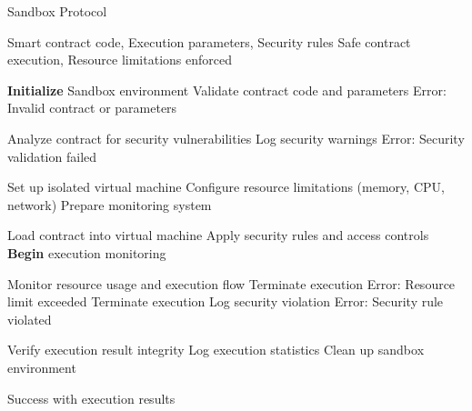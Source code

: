 
\begin{algorithm}
\caption{Sandbox Protocol}
\label{alg:sandbox}
\begin{algorithmic}[1]
\Require Smart contract code, Execution parameters, Security rules
\Ensure Safe contract execution, Resource limitations enforced

\State \textbf{Initialize} Sandbox environment
\State Validate contract code and parameters
    \State \Return Error: Invalid contract or parameters
\EndIf

\State Analyze contract for security vulnerabilities
    \State Log security warnings
    \State \Return Error: Security validation failed
\EndIf

\State Set up isolated virtual machine
\State Configure resource limitations (memory, CPU, network)
\State Prepare monitoring system

\State Load contract into virtual machine
\State Apply security rules and access controls
\State \textbf{Begin} execution monitoring

    \State Monitor resource usage and execution flow
        \State Terminate execution
        \State \Return Error: Resource limit exceeded
    \EndIf
        \State Terminate execution
        \State Log security violation
        \State \Return Error: Security rule violated
    \EndIf
\EndWhile

\State Verify execution result integrity
\State Log execution statistics
\State Clean up sandbox environment

\State \Return Success with execution results

\end{algorithmic}
\end{algorithm} 